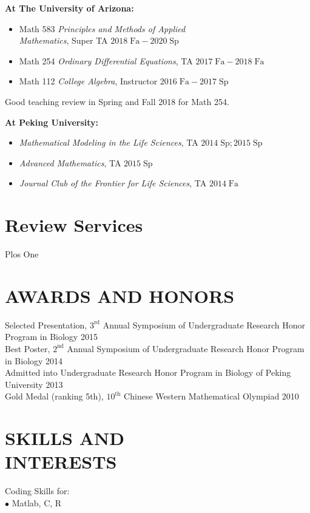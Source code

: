 \documentclass[margin, 11pt]{res} %
\begin{document}
\begin{resume}
{\bf At The University of Arizona:}
\begin{itemize}
\item Math 583 {\sl Principles and Methods of Applied \\ Mathematics}, Super TA \hfill $2018\;\mathrm{Fa}-2020\;\mathrm{Sp}$ 
\item Math 254 {\sl Ordinary Differential Equations}, TA \hfill $2017\;\mathrm{Fa}-2018\;\mathrm{Fa}$
\item Math 112 {\sl College Algebra}, Instructor \hfill $2016\;\mathrm{Fa}-2017\;\mathrm{Sp}$
\end{itemize}
Good teaching review in Spring and Fall 2018 for Math 254. 

{\bf At Peking University:}
\begin{itemize}
\item {\sl Mathematical Modeling in the Life Sciences}, TA \hfill $2014\; \mathrm{Sp};2015\; \mathrm{Sp}$
\item {\sl Advanced Mathematics}, TA \hfill $2015\; \mathrm{Sp}$
\item {\sl Journal Club of the Frontier for Life Sciences}, TA \hfill $2014\; \mathrm{Fa}$
\end{itemize}

\section{Review Services}
Plos One

\section{AWARDS AND HONORS}
\label{Awards}
Selected Presentation, $3^{\mathrm{rd}}$ Annual Symposium of Undergraduate Research Honor Program in Biology 2015\\
Best Poster, $2^{\mathrm{nd}}$ Annual Symposium of Undergraduate Research Honor Program in Biology  2014\\
Admitted into Undergraduate Research Honor Program in Biology of Peking University 2013\\
Gold Medal (ranking 5th), $10^{\mathrm{th}}$ Chinese Western Mathematical Olympiad 2010\\

\section{SKILLS AND\\ INTERESTS}
\label{Skills}

Coding Skills for:\\
$\bullet$  Matlab, C, R\\

\end{resume}
\end{document}
